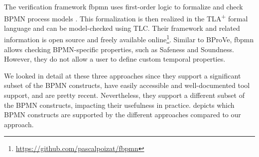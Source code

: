 \documentclass[submission, copyright, creativecommons]{eptcs}
\begin{document}
The verification framework \textsf{fbpmn} uses first-order logic to formalize and check BPMN process models \cite{houhouFirstOrderLogicVerification2022}.
This formalization is then realized in the TLA\textsuperscript{+} formal language and can be model-checked using TLC.
Their framework and related information is open source and freely available online\footnote{\url{https://github.com/pascalpoizat/fbpmn}}.
Similar to BProVe, \textsf{fbpmn} allows checking BPMN-specific properties, such as Safeness and Soundness.
However, they do not allow a user to define custom temporal properties.

We looked in detail at these three approaches since they support a significant subset of the BPMN constructs, have easily accessible and well-documented tool support, and are pretty recent.
Nevertheless, they support a different subset of the BPMN constructs, impacting their usefulness in practice.
 depicts which BPMN constructs are supported by the different approaches compared to our approach.
\end{document}
